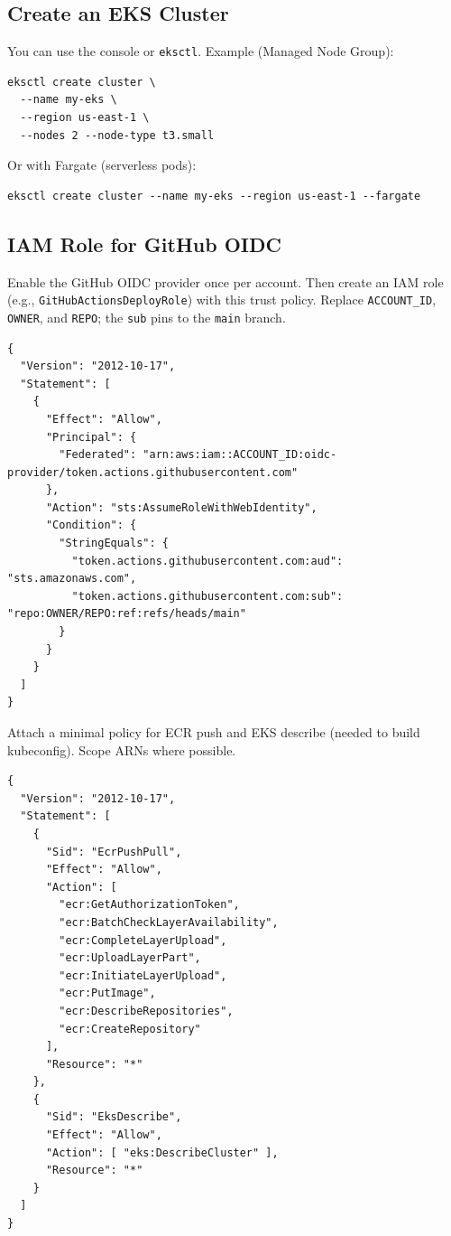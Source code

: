 \documentclass[11pt]{article}
\begin{document}
\subsection{Create an EKS Cluster}
You can use the console or \texttt{eksctl}. Example (Managed Node Group):
\begin{verbatim}
eksctl create cluster \
  --name my-eks \
  --region us-east-1 \
  --nodes 2 --node-type t3.small
\end{verbatim}
Or with Fargate (serverless pods):
\begin{verbatim}
eksctl create cluster --name my-eks --region us-east-1 --fargate
\end{verbatim}

\subsection{IAM Role for GitHub OIDC}
Enable the GitHub OIDC provider once per account. Then create an IAM role (e.g., \texttt{GitHubActionsDeployRole}) with this trust policy. Replace \texttt{ACCOUNT\_ID}, \texttt{OWNER}, and \texttt{REPO}; the \texttt{sub} pins to the \texttt{main} branch.
\begin{verbatim}
{
  "Version": "2012-10-17",
  "Statement": [
    {
      "Effect": "Allow",
      "Principal": {
        "Federated": "arn:aws:iam::ACCOUNT_ID:oidc-provider/token.actions.githubusercontent.com"
      },
      "Action": "sts:AssumeRoleWithWebIdentity",
      "Condition": {
        "StringEquals": {
          "token.actions.githubusercontent.com:aud": "sts.amazonaws.com",
          "token.actions.githubusercontent.com:sub": "repo:OWNER/REPO:ref:refs/heads/main"
        }
      }
    }
  ]
}
\end{verbatim}
\clearpage

Attach a minimal policy for ECR push and EKS describe (needed to build kubeconfig). Scope ARNs where possible.
\begin{verbatim}
{
  "Version": "2012-10-17",
  "Statement": [
    {
      "Sid": "EcrPushPull",
      "Effect": "Allow",
      "Action": [
        "ecr:GetAuthorizationToken",
        "ecr:BatchCheckLayerAvailability",
        "ecr:CompleteLayerUpload",
        "ecr:UploadLayerPart",
        "ecr:InitiateLayerUpload",
        "ecr:PutImage",
        "ecr:DescribeRepositories",
        "ecr:CreateRepository"
      ],
      "Resource": "*"
    },
    {
      "Sid": "EksDescribe",
      "Effect": "Allow",
      "Action": [ "eks:DescribeCluster" ],
      "Resource": "*"
    }
  ]
}
\end{verbatim}
\end{document}
